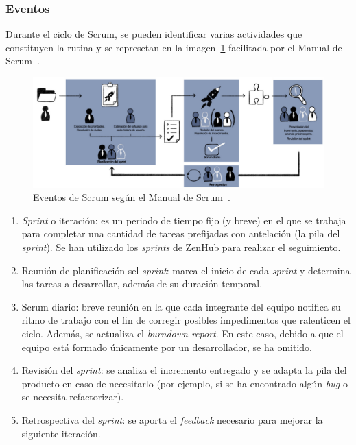 \subsubsection{Eventos}
Durante el ciclo de Scrum, se pueden identificar varias actividades que constituyen la rutina y se represetan en la imagen~\ref{img:eventos_scrum} facilitada por el Manual de Scrum~\cite{scrumMaster2022}.

\begin{figure}[h]
	\caption[Eventos de Scrum]{Eventos de Scrum según el Manual de Scrum~\cite{scrumMaster2022}.}
	\label{img:eventos_scrum}
	\centering
	\includegraphics[width=\textwidth]{../img/anexos/scrum/eventos}
\end{figure}

\begin{enumerate}
	\item \textit{Sprint} o iteración: es un periodo de tiempo fijo (y breve) en el que se trabaja para completar una cantidad de tareas prefijadas con antelación (la pila del \textit{sprint}). Se han utilizado los \textit{sprints} de ZenHub para realizar el seguimiento.
	\item Reunión de planificación sel \textit{sprint}: marca el inicio de cada \textit{sprint} y determina las tareas a desarrollar, además de su duración temporal.
	\item Scrum diario: breve reunión en la que cada integrante del equipo notifica su ritmo de trabajo con el fin de corregir posibles impedimentos que ralenticen el ciclo. Además, se actualiza el \textit{burndown report}. En este caso, debido a que el equipo está formado únicamente por un desarrollador, se ha omitido.
	\item Revisión del \textit{sprint}: se analiza el incremento entregado y se adapta la pila del producto en caso de necesitarlo (por ejemplo, si se ha encontrado algún \textit{bug} o se necesita refactorizar).
	\item Retrospectiva del \textit{sprint}: se aporta el \textit{feedback} necesario para mejorar la siguiente iteración.
\end{enumerate}


